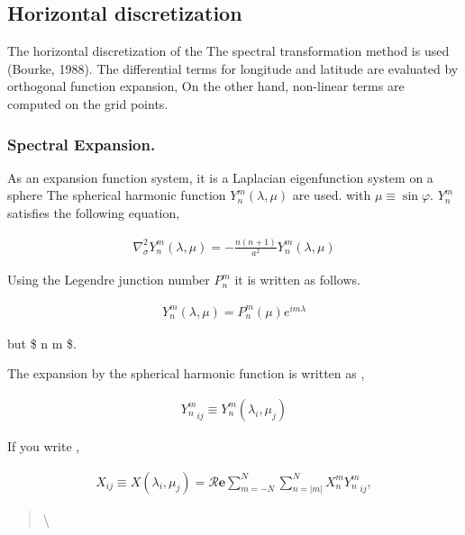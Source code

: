 \hypertarget{horizontal-discretization}{%
\subsection{Horizontal discretization}\label{horizontal-discretization}}

The horizontal discretization of the The spectral transformation method
is used (Bourke, 1988). The differential terms for longitude and
latitude are evaluated by orthogonal function expansion, On the other
hand, non-linear terms are computed on the grid points.

\hypertarget{spectral-expansion.}{%
\subsubsection{Spectral Expansion.}\label{spectral-expansion.}}

As an expansion function system, it is a Laplacian eigenfunction system
on a sphere The spherical harmonic function \(Y_n^m(\lambda,\mu)\) are
used. with \(\mu \equiv \sin\varphi\). \(Y_n^m\) satisfies the following
equation,

\begin{eqnarray}
\nabla^{2}_{\sigma} Y_n^m(\lambda,\mu) 
= - \frac{n(n+1)}{a^{2}} Y_n^m(\lambda,\mu) 
\end{eqnarray}

Using the Legendre junction number \(P_n^m\) it is written as follows.

\begin{eqnarray}
Y_n^m(\lambda,\mu) = P_n^m (\mu) e^{im \lambda}
\end{eqnarray}

but \$ n \geq \textbar{} m \textbar{} \$.

The expansion by the spherical harmonic function is written as ,

\begin{eqnarray}
   {Y_n^m}_{ij} \equiv Y_n^m ( \lambda_i, \mu_j )
\end{eqnarray}

If you write ,

\begin{eqnarray}
  X_{ij} \equiv X ( \lambda_i, \mu_j )
  =  {\mathcal R}\mathbf{e} \sum_{m=-N}^{N} \sum_{n=|m|}^{N} 
        X_n^m {Y_n^m}_{ij} ,
\end{eqnarray}

\begin{quote}
\protect\hypertarget{Sphericalux20Expansion}{}{\textbackslash{}}
\end{quote}

